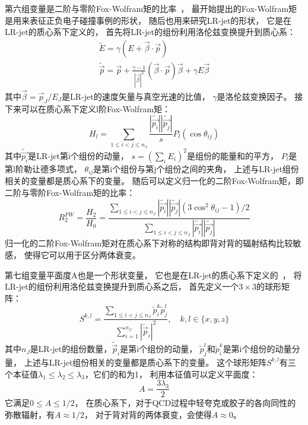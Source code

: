 第六组变量是二阶与零阶Fox-Wolfram矩的比率~\cite{JSS5}，
最开始提出的Fox-Wolfram矩是用来表征正负电子碰撞事例的形状，
随后也用来研究LR-jet的形状，
它是在LR-jet的质心系下定义的，
首先将LR-jet的组份利用洛伦兹变换提升到质心系：
\begin{equation} 
\label{eq:JSS5}
 \begin{aligned}
 \tilde{E}=\gamma(E+\vec{\beta}\cdot \vec{p})
\\
\tilde{\vec{p}}=\vec{p}+\frac{\gamma-1}{|\vec{\beta}|^2} (\vec{\beta}\cdot \vec{p}) \vec{\beta}+\gamma E\vec{\beta}
 \end{aligned}
\end{equation}
其中$\vec{\beta}=\vec{p}_J/E_J$是LR-jet的速度矢量与真空光速的比值，
$\gamma$是洛伦兹变换因子。
接下来可以在质心系下定义l阶Fox-Wolfram矩：
\begin{equation} 
\label{eq:JSS6}
H_l=\sum_{1\le i<j\le n_J} \frac{|\tilde{\vec{p_i}}| |\tilde{\vec{p_j}}|}{s} P_l (\cos \theta_{ij})
\end{equation}
其中$\tilde{\vec{p_i}}$是LR-jet第i个组份的动量，
$s=(\sum_i E_i)^2$是组份的能量和的平方，
$P_l$是第l阶勒让德多项式，
$\theta_{ij}$是第i个组份与第j个组份之间的夹角，
上述与LR-jet组份相关的变量都是质心系下的变量。
随后可以定义归一化的二阶Fox-Wolfram矩，即二阶与零阶Fox-Wolfram矩的比率：
\begin{equation} 
\label{eq:JSS61}
R_2^{FW}=\frac{H_2}{H_0}=\frac{\sum_{1\le i<j\le n_J} |\tilde{\vec{p_i}}| |\tilde{\vec{p_j}}|  (3\cos^2 \theta_{ij}-1 )/2 }
{\sum_{1\le i<j\le n_J} |\tilde{\vec{p_i}}| |\tilde{\vec{p_j}}|}
\end{equation}
归一化的二阶Fox-Wolfram矩对在质心系下对称的结构即背对背的辐射结构比较敏感，
使得它可以用于区分两体衰变。

第七组变量平面度A也是一个形状变量，
它也是在LR-jet的质心系下定义的~\cite{JSS6}，
将LR-jet的组份利用洛伦兹变换提升到质心系之后，
首先定义一个$3\times 3$的球形矩阵：
\begin{equation} 
\label{eq:JSS62}
S^{k,l}=\frac{ \sum_{1\le i<j\le n_J} \tilde{p}_i^k  \tilde{p}_j^l  }
{\sum_{i=1}^{n_J} |\tilde{\vec{p}}_i|^2}
,\quad k,l \in \{x,y,z\}
\end{equation}
其中$n_J$是LR-jet的组份数量，$\tilde{\vec{p}}_i$是第i个组份的动量，
$\tilde{p}_j^l$和$\tilde{p}_i^k$是第i个组份的动量分量，
上述与LR-jet组份相关的变量都是质心系下的变量。
这个球形矩阵$S^{k,l}$有三个本征值$\lambda_1\le \lambda_2\le \lambda_3$，它们的和为1，
利用本征值可以定义平面度：
\begin{equation} 
\label{eq:JSS63}
A=\frac{3\lambda_3}{2}
\end{equation}
它满足$0\le A \le 1/2$，
在质心系下，对于QCD过程中轻夸克或胶子的各向同性的弥散辐射，有$A\approx 1/2$，
对于背对背的两体衰变，会使得$A \approx 0$。


